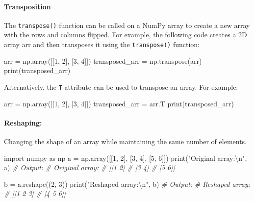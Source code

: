 \documentclass[11pt]{article}
\newenvironment{Shaded}{}{}
\newcommand{\DecValTok}[1]{\textcolor[rgb]{0.25,0.63,0.44}{{#1}}}
\newcommand{\CharTok}[1]{\textcolor[rgb]{0.25,0.44,0.63}{{#1}}}
\newcommand{\StringTok}[1]{\textcolor[rgb]{0.25,0.44,0.63}{{#1}}}
\newcommand{\CommentTok}[1]{\textcolor[rgb]{0.38,0.63,0.69}{\textit{{#1}}}}
\newcommand{\NormalTok}[1]{{#1}}
\newcommand{\ImportTok}[1]{{#1}}
\newcommand{\OperatorTok}[1]{\textcolor[rgb]{0.40,0.40,0.40}{{#1}}}
\newcommand{\BuiltInTok}[1]{{#1}}
\begin{document}
\hypertarget{transposition}{%
\paragraph{Transposition}\label{transposition}}

The \texttt{transpose()} function can be called on a NumPy array to
create a new array with the rows and columns flipped. For example, the
following code creates a 2D array arr and then transposes it using the
\texttt{transpose()} function:

\begin{Shaded}
\begin{Highlighting}[]
\NormalTok{arr }\OperatorTok{=}\NormalTok{ np.array([[}\DecValTok{1}\NormalTok{, }\DecValTok{2}\NormalTok{], [}\DecValTok{3}\NormalTok{, }\DecValTok{4}\NormalTok{]])}
\NormalTok{transposed\_arr }\OperatorTok{=}\NormalTok{ np.transpose(arr)}
\BuiltInTok{print}\NormalTok{(transposed\_arr)}
\end{Highlighting}
\end{Shaded}

Alternatively, the \texttt{T} attribute can be used to transpose an
array. For example:

\begin{Shaded}
\begin{Highlighting}[]
\NormalTok{arr }\OperatorTok{=}\NormalTok{ np.array([[}\DecValTok{1}\NormalTok{, }\DecValTok{2}\NormalTok{], [}\DecValTok{3}\NormalTok{, }\DecValTok{4}\NormalTok{]])}
\NormalTok{transposed\_arr }\OperatorTok{=}\NormalTok{ arr.T}
\BuiltInTok{print}\NormalTok{(transposed\_arr)}
\end{Highlighting}
\end{Shaded}

\hypertarget{reshaping}{%
\paragraph{Reshaping:}\label{reshaping}}

Changing the shape of an array while maintaining the same number of
elements.

\begin{Shaded}
\begin{Highlighting}[]
\ImportTok{import}\NormalTok{ numpy }\ImportTok{as}\NormalTok{ np}
\NormalTok{a }\OperatorTok{=}\NormalTok{ np.array([[}\DecValTok{1}\NormalTok{, }\DecValTok{2}\NormalTok{], [}\DecValTok{3}\NormalTok{, }\DecValTok{4}\NormalTok{], [}\DecValTok{5}\NormalTok{, }\DecValTok{6}\NormalTok{]])}
\BuiltInTok{print}\NormalTok{(}\StringTok{"Original array:}\CharTok{\textbackslash{}n}\StringTok{"}\NormalTok{, a)}
\CommentTok{\# Output: }
\CommentTok{\# Original array:}
\CommentTok{\#  [[1 2]}
\CommentTok{\#   [3 4]}
\CommentTok{\#   [5 6]]}

\NormalTok{b }\OperatorTok{=}\NormalTok{ a.reshape((}\DecValTok{2}\NormalTok{, }\DecValTok{3}\NormalTok{))}
\BuiltInTok{print}\NormalTok{(}\StringTok{"Reshaped array:}\CharTok{\textbackslash{}n}\StringTok{"}\NormalTok{, b)}
\CommentTok{\# Output: }
\CommentTok{\# Reshaped array:}
\CommentTok{\#  [[1 2 3]}
\CommentTok{\#   [4 5 6]]}
\end{Highlighting}
\end{Shaded}
\end{document}
